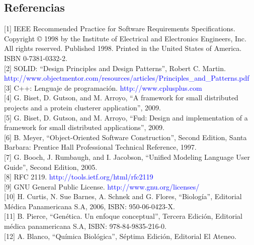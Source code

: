 \documentclass[12pt,a4paper,english,spanish]{article}
\begin{document}
\subsection{Referencias}
[1] IEEE Recommended Practice for Software Requirements Specifications. Copyright © 1998 by the Institute of Electrical and Electronics Engineers, Inc. All rights reserved. Published 1998. Printed in the United States of America. ISBN 0-7381-0332-2. \\

[2] SOLID: ``Design Principles and Design Patterns'', Robert C. Martin. \textcolor{blue}{http://www.objectmentor.com/resources/articles/Principles\_and\_Patterns.pdf} \\

[3] C++: Lenguaje de programación. \textcolor{blue}{http://www.cplusplus.com} \\

[4] G. Biset, D. Gutson, and M. Arroyo, “A framework for small distributed projects and a protein clusterer application”, 2009. \\

[5] G. Biset, D. Gutson, and M. Arroyo, “Fud: Design and implementation of a framework for small distributed applications”, 2009. \\

[6] B. Meyer, “Object-Oriented Software Construction”, Second Edition, Santa Barbara: Prentice Hall Professional Technical Reference, 1997. \\

[7] G. Booch, J. Rumbaugh, and I. Jacobson, “Unified Modeling Language User Guide”, Second Edition, 2005. \\

[8] RFC 2119. \textcolor{blue}{http://tools.ietf.org/html/rfc2119} \\

[9] GNU General Public License. \textcolor{blue}{http://www.gnu.org/licenses/} \\

[10] H. Curtis, N. Sue Barnes, A. Schnek and G. Flores, “Biología”, Editorial Médica Panamericana S.A, 2006, ISBN: 950-06-0423-X. \\

[11] B. Pierce, “Genética. Un enfoque conceptual”, Tercera Edición, Editorial médica panamericana S.A, ISBN: 978-84-9835-216-0. \\

[12] A. Blanco, “Química Biológica”, Séptima Edición, Editorial El Ateneo. \\
\end{document}
